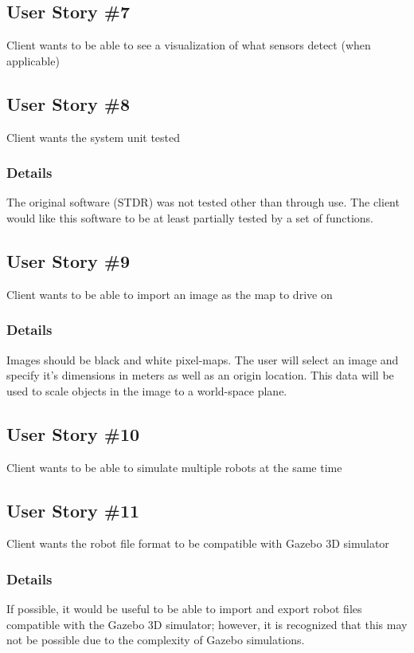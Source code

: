 \subsection{User Story \#7\label{us:7}} 
Client wants to be able to see a visualization of what sensors detect (when applicable)

\subsection{User Story \#8\label{us:8}} 
Client wants the system unit tested

\subsubsection*{Details}
The original software (STDR) was not tested other than through use. The client would like this software to be at least partially tested by a set of functions.

\subsection{User Story \#9\label{us:9}} 
Client wants to be able to import an image as the map to drive on

\subsubsection*{Details}
Images should be black and white pixel-maps. The user will select an image and specify it's dimensions in meters as well as an origin location. This data will be used to scale objects in the image to a world-space plane.

\subsection{User Story \#10\label{us:10}} 
Client wants to be able to simulate multiple robots at the same time

\subsection{User Story \#11\label{us:11}} 
Client wants the robot file format to be compatible with Gazebo 3D simulator

\subsubsection*{Details}
If possible, it would be useful to be able to import and export robot files compatible with the Gazebo 3D simulator; however, it is recognized that this may not be possible due to the complexity of Gazebo simulations.

